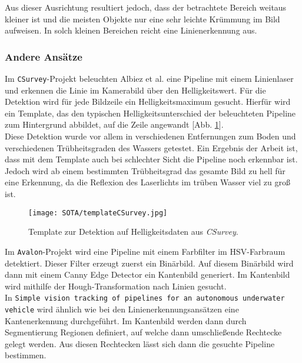 Aus dieser Ausrichtung resultiert jedoch, dass der betrachtete Bereich weitaus kleiner ist und die meisten Objekte nur eine sehr leichte Krümmung im Bild aufweisen. In solch kleinen Bereichen reicht eine Linienerkennung aus.

\subsubsection{Andere Ansätze}
Im \texttt{CSurvey}-Projekt \cite{Albiez2015CSurveyA} beleuchten Albiez et al. eine Pipeline mit einem Linienlaser und erkennen die Linie im Kamerabild über den Helligkeitswert. Für die Detektion wird für jede Bildzeile ein Helligkeitsmaximum gesucht. Hierfür wird ein Template, das den typischen Helligkeitsunterschied der beleuchteten Pipeline zum Hintergrund abbildet, auf die Zeile angewandt [Abb. \ref{templateCSurv}].\\
Diese Detektion wurde vor allem in verschiedenen Entfernungen zum Boden und verschiedenen Trübheitsgraden des Wassers getestet. Ein Ergebnis der Arbeit ist, dass mit dem Template auch bei schlechter Sicht die Pipeline noch erkennbar ist. Jedoch wird ab einem bestimmten Trübheitsgrad das gesamte Bild zu hell für eine Erkennung, da die Reflexion des Laserlichts im trüben Wasser viel zu groß ist.\\
\begin{figure}[H]
\centering
\texttt{[image: SOTA/templateCSurvey.jpg]}
\caption[Template zur Pipelinedetektion aus \textit{CSurvey}]{Template zur Detektion auf Helligkeitsdaten aus \textit{CSurvey}.}
\label{templateCSurv}
\end{figure}
Im \texttt{Avalon}-Projekt \cite{avalon} wird eine Pipeline mit einem Farbfilter im HSV-Farbraum detektiert. Dieser Filter erzeugt zuerst ein Binärbild. Auf diesem Binärbild wird dann mit einem Canny Edge Detector ein Kantenbild generiert. Im Kantenbild wird mithilfe der Hough-Transformation nach Linien gesucht.\\
In \texttt{Simple vision tracking of pipelines for an autonomous underwater vehicle}\cite{hallset1991simple} wird ähnlich wie bei den Linienerkennungsansätzen eine Kantenerkennung durchgeführt. Im Kantenbild werden dann durch Segmentierung Regionen definiert, auf welche dann umschließende Rechtecke gelegt werden.
Aus diesen Rechtecken lässt sich dann die gesuchte Pipeline bestimmen.\\
